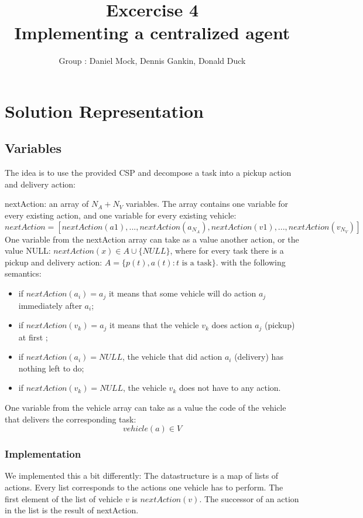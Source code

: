 \documentclass[11pt]{article}
\title{\bf Excercise 4\\ Implementing a centralized agent}
\author{Group \textnumero 29 : Daniel Mock, Dennis Gankin, Donald Duck}
\begin{document}
\maketitle

\section{Solution Representation}

\subsection{Variables}
The idea is to use the provided CSP and decompose a task into a pickup action and delivery action:

nextAction: 
an array of $N_A +N_V$ variables. 
The array contains one variable	for every existing action, and one variable for every existing vehicle:
$nextAction = [nextAction(a1), . . . , nextAction(a_{N_A}
), nextAction(v1), . . ., nextAction(v_{N_V}
)]$
One variable from the nextAction array can take as a value another action,
or the value NULL:
$nextAction(x) \in A \cup \{NULL\}$, where for every task there is a pickup and delivery action:
$A = \{p(t), a(t) \colon t \text{ is a task}\}$.
with the following semantics:
\begin{itemize}
	\item  if $nextAction(a_i) = a_j$ it means that some vehicle will do action $a_j$ immediately after $a_i$;
	\item  if $nextAction(v_k) = a_j$ it means that the vehicle $v_k$ does action $a_j$ (pickup) at first ;
	\item if $nextAction(a_i) = NULL$, the vehicle that did action $a_i$ (delivery) has nothing left to do;
	\item if $nextAction(v_k) = NULL$, the vehicle $v_k$ does not have to any action.
\end{itemize}

One variable from the vehicle array can take as a value the code of the
vehicle that delivers the corresponding task:
$$ vehicle(a) \in V$$

\subsubsection{Implementation}
We implemented this a bit differently:
The datastructure is a map of lists of actions.
Every list corresponds to the actions one vehicle has to perform.
The first element of the list of vehicle $v$ is $nextAction(v)$.
The successor of an action in the list is the result of nextAction.
\end{document}

